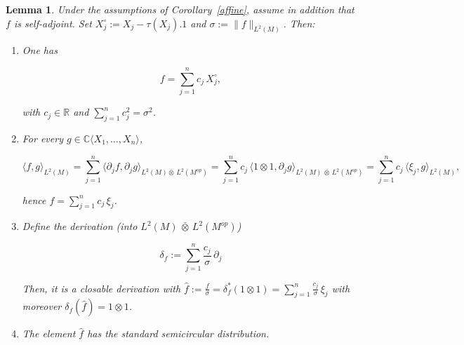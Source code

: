 \documentclass[10pt,a4paper,reqno]{amsart}
\newtheorem{lemma}[theorem]{Lemma}
\newcommand{\R}{\mathbb{R}}
\newcommand{\A}{\mathbb{C}\langle X_1,\dots,X_n\rangle}
\begin{document}
\begin{lemma}
\label{lem:affine-conjugates-semicircle}
Under the assumptions of Corollary~\ref{affine}, assume in addition that $f$ is self-adjoint.
Set $X_j^\circ:=X_j-\tau(X_j).1$ and $\sigma:=\|f\|_{L^2(M)}$.
Then:
\begin{enumerate}
\item One has


\[
  f=\sum_{j=1}^n c_j\,X_j^\circ,
\]


with $c_j\in\R$ and $\sum_{j=1}^n c_j^2=\sigma^2$.

\item For every $g\in\A$,


\[
  \langle f,g\rangle_{L^2(M)}
  =\sum_{j=1}^n \langle \partial_j f,\partial_j g\rangle_{L^2(M)\bar\otimes\,L^2(M^{op})}
  =\sum_{j=1}^n c_j\,\langle 1\otimes 1,\partial_j g\rangle_{L^2(M)\,\bar\otimes\,L^2(M^{op})}
  =\sum_{j=1}^n c_j\,\langle \xi_j,g\rangle_{L^2(M)},
\]


hence $f=\sum_{j=1}^n c_j\,\xi_j$.

\item Define the derivation (into $L^2(M)\,\bar\otimes\,L^2(M^{op})$)


\[
  \delta_f := \sum_{j=1}^n \frac{c_j}{\sigma}\,\partial_j
\]


Then, it is a closable derivation with $\widehat{f}:=\frac {f}{\sigma}=\delta_f^\ast(1\otimes 1)
  =\sum_{j=1}^n \frac{c_j}{\sigma}\,\xi_j$ with moreover $\delta_f(\widehat f)=1\otimes 1$.



\item The element $\widehat{f}$ has  the standard semicircular distribution.
\end{enumerate}
\end{lemma}
\end{document}
